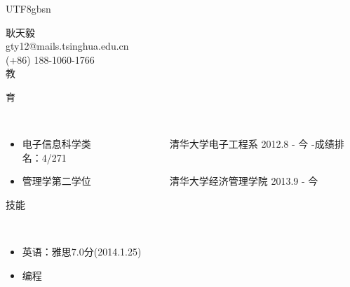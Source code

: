\documentclass{article}
\newenvironment{changemargin}[2]{%
  \begin{list}{}{%
    \setlength{\topsep}{0pt}%
    \setlength{\leftmargin}{#1}%
    \setlength{\rightmargin}{#2}%
    \setlength{\listparindent}{\parindent}%
    \setlength{\itemindent}{\parindent}%
    \setlength{\parsep}{\parskip}%
  }%
  \item[]}{\end{list}
}
\newcommand{\lineover}{
	\begin{changemargin}{-0.05in}{-0.05in}
		\vspace*{-8pt}
		\hrulefill \\
		\vspace*{-2pt}
	\end{changemargin}
}
\newcommand{\contact}[4]{
	\begin{changemargin}{-0.5in}{-0.5in}
		\begin{center}
			{\Large \scshape {#1}}\\ \smallskip
			{#2}\\ \smallskip 
			{#3}\\ \smallskip
			{#4}\smallskip
		\end{center}
	\end{changemargin}
}
\begin{document}
\begin{CJK*}{UTF8}{gbsn}
\contact{耿天毅}{gty12@mails.tsinghua.edu.cn}{(+86) 188-1060-1766}

教育
\lineover
\begin{itemize}
\item 电子信息科学类\ \ \ \ \ \ \ \ \ \ \ \ \ \ \ \ 清华大学电子工程系 \hfill 2012.8 - 今
\subitem -成绩排名：4/271
\item 管理学第二学位\ \ \ \ \ \ \ \ \ \ \ \ \ \ \ \ 清华大学经济管理学院 \hfill 2013.9 - 今
\end{itemize}
技能
\lineover
\begin{itemize}
\item 英语：雅思7.0分(2014.1.25)
\item 编程
\end{itemize}


\end{CJK*}
\end{document}

